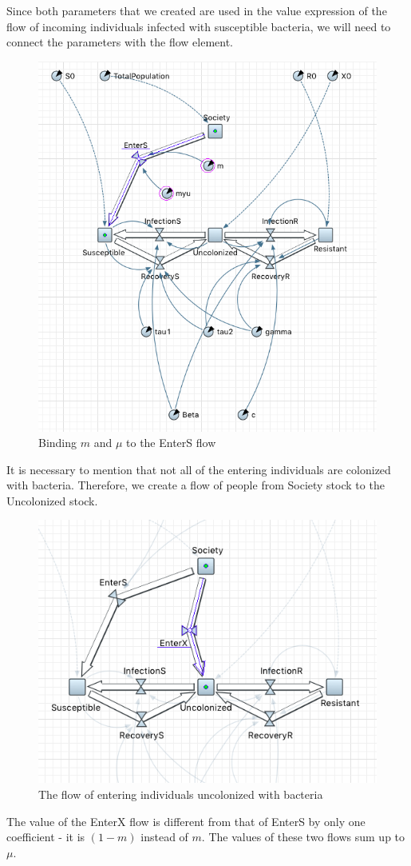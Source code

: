Since both parameters that we created are used in the value expression of the flow of incoming individuals infected with susceptible bacteria, we will need to connect the parameters with the flow element.

\begin{figure}[H]
  \centering
  \includegraphics[height=0.6\textwidth]{img/screens/society/society8}
  \caption{Binding $m$ and $\mu$ to the EnterS flow}
\end{figure}

It is necessary to mention that not all of the entering individuals are colonized with bacteria. Therefore, we create a flow of people from Society stock to the Uncolonized stock.

\begin{figure}[H]
  \centering
  \includegraphics[height=0.5\textwidth]{img/screens/society/society9}
  \caption{The flow of entering individuals uncolonized with bacteria}
\end{figure}

The value of the EnterX flow is different from that of EnterS by only one coefficient - it is $(1 - m)$ instead of $m$. The values of these two flows sum up to $\mu$.


